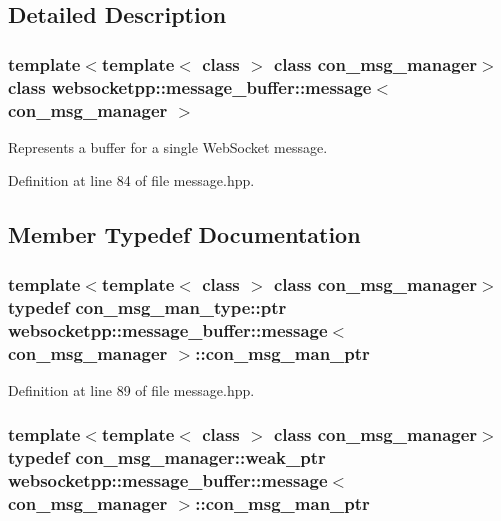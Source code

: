 \subsection{Detailed Description}
\subsubsection*{template$<$template$<$ class $>$ class con\+\_\+msg\+\_\+manager$>$class websocketpp\+::message\+\_\+buffer\+::message$<$ con\+\_\+msg\+\_\+manager $>$}

Represents a buffer for a single Web\+Socket message. 

Definition at line 84 of file message.\+hpp.



\subsection{Member Typedef Documentation}
\hypertarget{classwebsocketpp_1_1message__buffer_1_1message_abb7a33ceab94975c7503102537c33b48}{}
\subsubsection[{con\+\_\+msg\+\_\+man\+\_\+ptr}]{\setlength{\rightskip}{0pt plus 5cm}template$<$template$<$ class $>$ class con\+\_\+msg\+\_\+manager$>$ typedef con\+\_\+msg\+\_\+man\+\_\+type\+::ptr {\bf websocketpp\+::message\+\_\+buffer\+::message}$<$ con\+\_\+msg\+\_\+manager $>$\+::{\bf con\+\_\+msg\+\_\+man\+\_\+ptr}}\label{classwebsocketpp_1_1message__buffer_1_1message_abb7a33ceab94975c7503102537c33b48}


Definition at line 89 of file message.\+hpp.

\hypertarget{classwebsocketpp_1_1message__buffer_1_1message_a7fff9a702f65dc3f1b75058664833db5}{}
\subsubsection[{con\+\_\+msg\+\_\+man\+\_\+ptr}]{\setlength{\rightskip}{0pt plus 5cm}template$<$template$<$ class $>$ class con\+\_\+msg\+\_\+manager$>$ typedef con\+\_\+msg\+\_\+manager\+::weak\+\_\+ptr {\bf websocketpp\+::message\+\_\+buffer\+::message}$<$ con\+\_\+msg\+\_\+manager $>$\+::{\bf con\+\_\+msg\+\_\+man\+\_\+ptr}}\label{classwebsocketpp_1_1message__buffer_1_1message_a7fff9a702f65dc3f1b75058664833db5}


